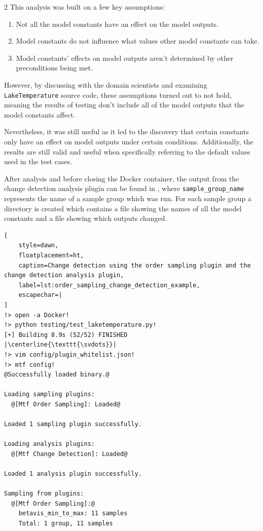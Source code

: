 \documentclass[10pt]{article}
\DeclareRobustCommand{\svdots}{%
  \vbox{
    \baselineskip=0.33333\normalbaselineskip
    \lineskiplimit=0pt
    \hbox{.}\hbox{.}\hbox{.}
    \kern-0.2\baselineskip
  }
}
\begin{document}
\begin{multicols}{2}
This analysis was built on a few key assumptions: 
\begin{enumerate}
    \item Not all the model constants have an effect on the model outputs. 
    \item Model constants do not influence what values other model constants can take. 
    \item Model constants' effects on model outputs aren't determined by other preconditions being met.
\end{enumerate}
However, by discussing with the domain scientists and examining \verb|LakeTemperature| source code, these assumptions turned out to not hold, meaning the results of testing don't include all of the model outputs that the model constants affect. 

Nevertheless, it was still useful as it led to the discovery that certain constants only have an effect on model outputs under certain conditions. Additionally, the results are still valid and useful when specifically referring to the default values used in the test cases. 

After analysis and before closing the Docker container, the output from the change detection analysis plugin can be found in , where \texttt{sample\_group\_name} represents the name of a sample group which was run. For each sample group a directory is created which contains a file showing the names of all the model constants and a file showing which outputs changed. 

\begin{lstlisting}[
    style=dawn,
    floatplacement=ht,
    caption=Change detection using the order sampling plugin and the change detection analysis plugin,
    label=lst:order_sampling_change_detection_example,
    escapechar=|
]
!> open -a Docker!
!> python testing/test_laketemperature.py!
[+] Building 8.9s (52/52) FINISHED
|\centerline{\texttt{\svdots}}|
!> vim config/plugin_whitelist.json!
!> mtf config!
@Successfully loaded binary.@

Loading sampling plugins:
  @[Mtf Order Sampling]: Loaded@

Loaded 1 sampling plugin successfully. 

Loading analysis plugins:
  @[Mtf Change Detection]: Loaded@

Loaded 1 analysis plugin successfully. 

Sampling from plugins:
  @[Mtf Order Sampling]:@
    betavis_min_to_max: 11 samples
    Total: 1 group, 11 samples


\end{lstlisting}
\end{multicols}
\end{document}
